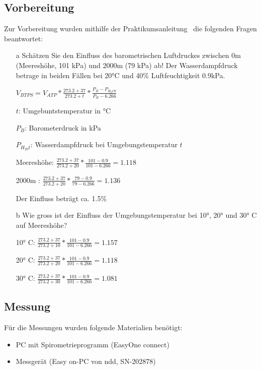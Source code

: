 \documentclass[11pt]{scrartcl}
\begin{document}
    \subsection{Vorbereitung}

    Zur Vorbereitung wurden mithilfe der Praktikumsanleitung~\parencite{Spirometrie} die folgenden Fragen beantwortet: %

    \begin{itemize}
        \item[a] Schätzen Sie den Einfluss des barometrischen Luftdruckes zwischen 0m (Meereshöhe, 101 kPa) und 2000m (79 kPa) ab!
                 Der Wasserdampfdruck betrage in beiden Fällen bei 20°C und 40\% Luftfeuchtigkeit 0.9kPa.
        \item[]  $V_{BTPS}=V_{ATP}*\frac{273.2+37}{273.2+t}*\frac{P_B-P_{H_2Ot}}{P_B-6.266}$
        \item[] $t$: Umgebuntstemperatur in °C
        \item[] $P_B$: Barometerdruck in kPa
        \item[] $P_{H_20t}$: Wasserdampfdruck bei Umgebungstemperatur $t$
        \item[] Meereshöhe: $\frac{273.2+37}{273.2+20}*\frac{101-0.9}{101-6.266}=1.118$
        \item[] 2000m : $\frac{273.2+37}{273.2+20}*\frac{79-0.9}{79-6.266}=1.136$
        \item[] Der Einfluss beträgt ca. 1.5\%
        \item[b] Wie gross ist der Einfluss der Umgebungstemperatur bei 10°, 20° und 30° C auf Meereshöhe?
        \item[] 10° C: $\frac{273.2+37}{273.2+10}*\frac{101-0.9}{101-6.266}=1.157$
        \item[] 20° C: $\frac{273.2+37}{273.2+20}*\frac{101-0.9}{101-6.266}=1.118$
        \item[] 30° C: $\frac{273.2+37}{273.2+30}*\frac{101-0.9}{101-6.266}=1.081$ %

    \end{itemize}

    \subsection{Messung}

    Für die Messungen wurden folgende Materialien benötigt:

    \begin{itemize}
        \item PC mit Spirometrieprogramm (EasyOne connect)
        \item Messgerät (Easy on-PC von ndd, SN-202878)
    \end{itemize}
\end{document}
